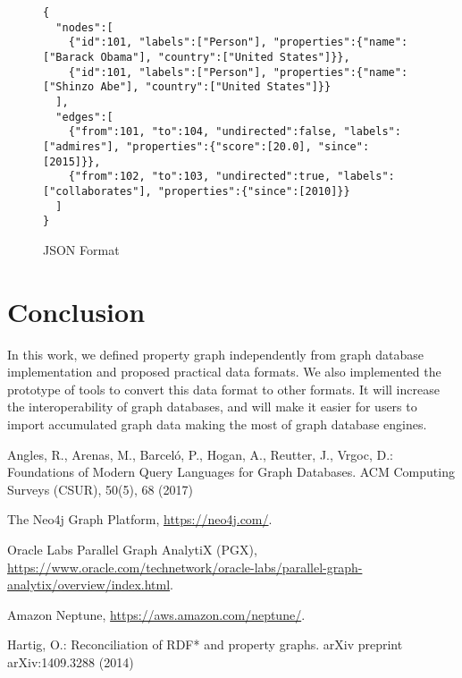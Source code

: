 \documentclass[runningheads]{llncs}
\begin{document}
\begin{figure}[!t]
\vspace{2mm}
\begin{scriptsize}
\begin{verbatim}
{
  "nodes":[
    {"id":101, "labels":["Person"], "properties":{"name":["Barack Obama"], "country":["United States"]}},
    {"id":101, "labels":["Person"], "properties":{"name":["Shinzo Abe"], "country":["United States"]}}
  ],
  "edges":[
    {"from":101, "to":104, "undirected":false, "labels":["admires"], "properties":{"score":[20.0], "since":[2015]}},
    {"from":102, "to":103, "undirected":true, "labels":["collaborates"], "properties":{"since":[2010]}}
  ]
}
\end{verbatim}
\end{scriptsize}
\caption{JSON Format}
\label{fig:format-jsonpg}
\end{figure}

\section{Conclusion}
In this work, we defined property graph independently from graph database implementation and proposed practical data formats. We also implemented the prototype of tools to convert this data format to other formats. 
It will increase the interoperability of graph databases, and will make it easier for users to import accumulated graph data making the most of graph database engines.

%
%
%
% 
% 
%
\begin{thebibliography}{8}

Angles, R., Arenas, M., Barceló, P., Hogan, A., Reutter, J., Vrgoc, D.: Foundations of Modern Query Languages for Graph Databases. ACM Computing Surveys (CSUR), 50(5), 68 (2017)

The Neo4j Graph Platform, \url{https://neo4j.com/}.

Oracle Labs Parallel Graph AnalytiX (PGX), \url{https://www.oracle.com/technetwork/oracle-labs/parallel-graph-analytix/overview/index.html}.

Amazon Neptune, \url{https://aws.amazon.com/neptune/}.

Hartig, O.: Reconciliation of RDF* and property graphs. arXiv preprint arXiv:1409.3288 (2014)

\end{thebibliography}
\end{document}
